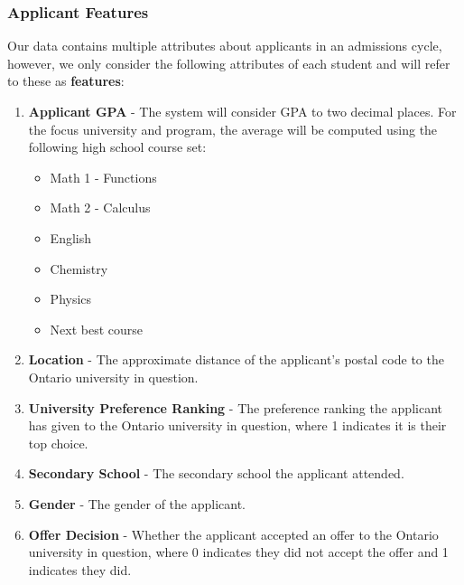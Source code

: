 \documentclass{article}
\begin{document}
\begin{normalsize}
        \subsubsection{Applicant Features}
        Our data contains multiple attributes about applicants in an admissions cycle, however, we only consider the following attributes of each student and will refer to these as \textbf{features}:
        \begin{enumerate}
            \item \textbf{Applicant GPA} - 
                    The system will consider GPA to two decimal places. For the focus university and program, the average will be computed using the following high school course set:
                    \begin{itemize}
                        \item Math 1 - Functions
                        \item Math 2 - Calculus
                        \item English
                        \item Chemistry
                        \item Physics
                        \item Next best course
                    \end{itemize}









































            \item \textbf{Location} - The approximate distance of the applicant's postal code to the Ontario university in question.
            \item \textbf{University Preference Ranking} - The preference ranking the applicant has given to the Ontario university in question, where 1 indicates it is their top choice.
            \item \textbf{Secondary School} - The secondary school the applicant attended.
            \item \textbf{Gender} - The gender of the applicant.
            \item \textbf{Offer Decision} - Whether the applicant accepted an offer to the Ontario university in question, where 0 indicates they did not accept the offer and 1 indicates they did.
        \end{enumerate}
        

\end{normalsize}
\end{document}
